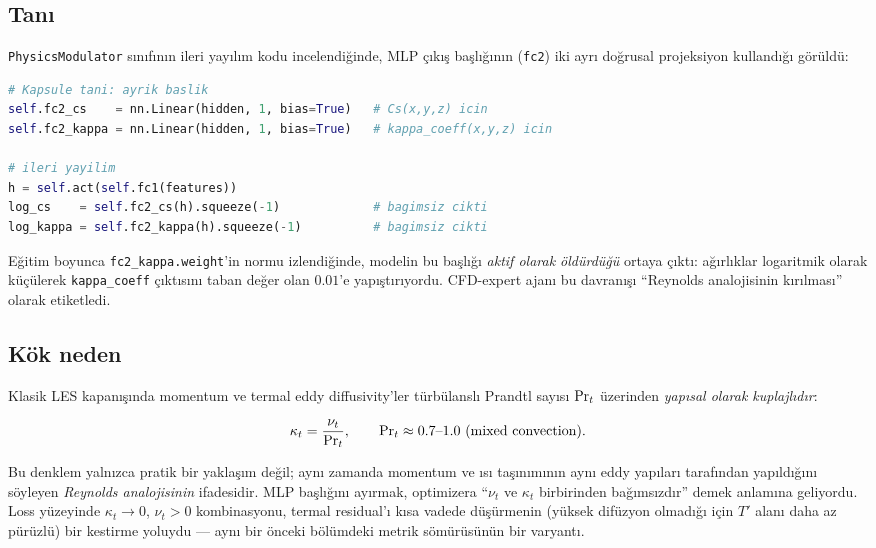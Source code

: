 \subsection*{Tanı}

\texttt{PhysicsModulator} sınıfının ileri yayılım kodu incelendiğinde, MLP çıkış başlığının (\texttt{fc2}) iki ayrı doğrusal projeksiyon kullandığı görüldü:

\begin{lstlisting}[language=Python,caption={MLP çıkış başlığı: ayrılmış (hatalı) versiyon}]
# Kapsule tani: ayrik baslik
self.fc2_cs    = nn.Linear(hidden, 1, bias=True)   # Cs(x,y,z) icin
self.fc2_kappa = nn.Linear(hidden, 1, bias=True)   # kappa_coeff(x,y,z) icin

# ileri yayilim
h = self.act(self.fc1(features))
log_cs    = self.fc2_cs(h).squeeze(-1)             # bagimsiz cikti
log_kappa = self.fc2_kappa(h).squeeze(-1)          # bagimsiz cikti
\end{lstlisting}

Eğitim boyunca \texttt{fc2\_kappa.weight}'in normu izlendiğinde, modelin bu başlığı \textit{aktif olarak öldürdüğü} ortaya çıktı: ağırlıklar logaritmik olarak küçülerek \texttt{kappa\_coeff} çıktısını taban değer olan $0.01$'e yapıştırıyordu. CFD-expert ajanı bu davranışı ``Reynolds analojisinin kırılması'' olarak etiketledi.

\subsection*{Kök neden}

Klasik LES kapanışında momentum ve termal eddy diffusivity'ler türbülanslı Prandtl sayısı $\mathrm{Pr}_t$ üzerinden \textit{yapısal olarak kuplajlıdır}:

\begin{equation}
    \kappa_t = \frac{\nu_t}{\mathrm{Pr}_t}, \qquad \mathrm{Pr}_t \approx 0.7\text{--}1.0 \text{ (mixed convection)}.
    \label{eq:reynolds_analogy}
\end{equation}

Bu denklem yalnızca pratik bir yaklaşım değil; aynı zamanda momentum ve ısı taşınımının aynı eddy yapıları tarafından yapıldığını söyleyen \textit{Reynolds analojisinin} ifadesidir. MLP başlığını ayırmak, optimizera ``$\nu_t$ ve $\kappa_t$ birbirinden bağımsızdır'' demek anlamına geliyordu. Loss yüzeyinde $\kappa_t \to 0$, $\nu_t > 0$ kombinasyonu, termal residual'ı kısa vadede düşürmenin (yüksek difüzyon olmadığı için $T'$ alanı daha az pürüzlü) bir kestirme yoluydu --- aynı bir önceki bölümdeki metrik sömürüsünün bir varyantı.

